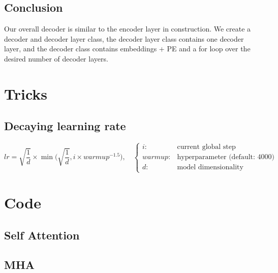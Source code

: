 \documentclass[11pt]{article}
\begin{document}
\subsection{Conclusion}

Our overall decoder is similar to the encoder layer in construction. We create a decoder and decoder layer class, the decoder layer class contains one decoder layer, and the decoder class contains embeddings + PE and a for loop over the desired number of decoder layers.

\section{Tricks}

\subsection{Decaying learning rate}

\begin{equation}
    lr = \sqrt{\frac 1 d } \times \min\Bigg(\sqrt{\frac 1 d}, i \times warmup^{-1.5}\Bigg), \quad \begin{cases}
        i: & \text{current global step} \\ 
        warmup: & \text{hyperparameter (default: 4000)} \\
        d: & \text{model dimensionality}
    \end{cases}
\end{equation}

\section{Code}

\subsection{Self Attention}



\subsection{MHA}



\printbibliography
{}
\end{document}
